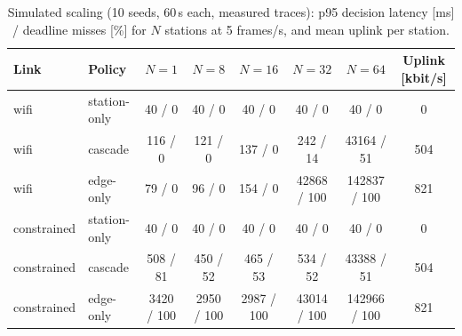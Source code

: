 \begin{table}[t]
\centering
\caption{Simulated scaling (10 seeds, 60\,s each, measured traces): p95 decision latency [ms] / deadline misses [\%] for $N$ stations at 5 frames/s, and mean uplink per station.}
\label{tab:sim}
\footnotesize
\begin{tabular}{@{}llcccccc@{}}
\toprule
Link & Policy & $N=1$ & $N=8$ & $N=16$ & $N=32$ & $N=64$ & Uplink [kbit/s] \\
\midrule
wifi & station-only & 40 / 0 & 40 / 0 & 40 / 0 & 40 / 0 & 40 / 0 & 0 \\
wifi & cascade & 116 / 0 & 121 / 0 & 137 / 0 & 242 / 14 & 43164 / 51 & 504 \\
wifi & edge-only & 79 / 0 & 96 / 0 & 154 / 0 & 42868 / 100 & 142837 / 100 & 821 \\ \midrule
constrained & station-only & 40 / 0 & 40 / 0 & 40 / 0 & 40 / 0 & 40 / 0 & 0 \\
constrained & cascade & 508 / 81 & 450 / 52 & 465 / 53 & 534 / 52 & 43388 / 51 & 504 \\
constrained & edge-only & 3420 / 100 & 2950 / 100 & 2987 / 100 & 43014 / 100 & 142966 / 100 & 821 \\
\bottomrule
\end{tabular}
\end{table}
